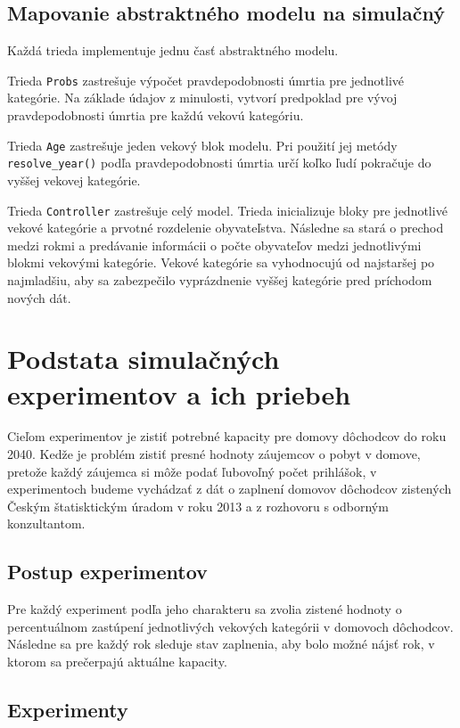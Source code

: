 \documentclass[a4paper, 11pt]{article}
\begin{document}
\subsection{Mapovanie abstraktného modelu na simulačný}
Každá trieda implementuje jednu časť abstraktného modelu.

Trieda \texttt{Probs} zastrešuje výpočet pravdepodobnosti úmrtia pre jednotlivé kategórie. Na základe údajov z minulosti, vytvorí predpoklad pre vývoj pravdepodobnosti úmrtia pre každú vekovú kategóriu.

Trieda \texttt{Age} zastrešuje jeden vekový blok modelu. Pri použití jej metódy \texttt{resolve\_year()} podľa pravdepodobnosti úmrtia určí koľko ľudí pokračuje do vyššej vekovej kategórie.

Trieda \texttt{Controller} zastrešuje celý model. Trieda inicializuje bloky pre jednotlivé vekové kategórie a prvotné rozdelenie obyvateľstva. Následne sa stará o prechod medzi rokmi a predávanie informácii o počte obyvateľov medzi jednotlivými blokmi vekovými kategórie. Vekové kategórie sa vyhodnocujú od najstaršej po najmladšiu, aby sa zabezpečilo vyprázdnenie vyššej kategórie pred príchodom nových dát.

\section{Podstata simulačných experimentov a ich priebeh}
Cieľom experimentov je zistiť potrebné kapacity pre domovy dôchodcov do roku 2040. Kedže je problém zistiť presné hodnoty záujemcov o pobyt v domove, pretože každý záujemca si môže podať ľubovoľný počet prihlášok, v experimentoch budeme vychádzať z dát o zaplnení domovov dôchodcov zistených Českým štatisktickým úradom v roku 2013 \cite{domovy2013} a z rozhovoru s odborným konzultantom.
\subsection{Postup experimentov}
Pre každý experiment podľa jeho charakteru sa zvolia zistené hodnoty o percentuálnom zastúpení jednotlivých vekových kategórii v domovoch dôchodcov. Následne sa pre každý rok sleduje stav zaplnenia, aby bolo možné nájsť rok, v ktorom sa prečerpajú aktuálne kapacity.
\subsection{Experimenty}
\end{document}
